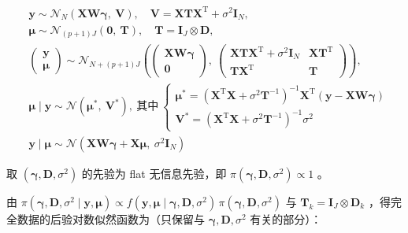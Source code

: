 \documentclass[12pt,a4paper]{ctexart}
\numberwithin{figure}{section}
\numberwithin{table}{section}
\begin{document}
\begin{equation*}
\begin{aligned}
&\boldsymbol{y}\sim\mathcal{N}_{N}\left(\mathbf{XW}\boldsymbol{\gamma},\ \mathbf{V}\right),\quad \mathbf{V}=\mathbf{XTX}^{\mathrm{T}}+\sigma^{2}\mathbf{I}_{N},\\
&\boldsymbol{\mu}\sim\mathcal{N}_{(p+1)J}\left(\mathbf{0},\ \mathbf{T}\right),\quad \mathbf{T}=\mathbf{I}_{J}\otimes\mathbf{D},\\
&\begin{pmatrix}\boldsymbol{y}\\[2pt]\boldsymbol{\mu}\end{pmatrix}\sim\mathcal{N}_{N+(p+1)J}\left(\begin{pmatrix}\mathbf{XW}\boldsymbol{\gamma}\\[2pt]\mathbf{0}\end{pmatrix},\ \begin{pmatrix}\mathbf{XTX}^{\mathrm{T}}+\sigma^{2}\mathbf{I}_{N} & \mathbf{XT}^{\mathrm{T}}\\[2pt]\mathbf{TX}^{\mathrm{T}} & \mathbf{T}\end{pmatrix}\right),\\
&\boldsymbol{\mu}\mid\boldsymbol{y}\sim\mathcal{N}\left(\boldsymbol{\mu}^{*},\ \mathbf{V}^{*}\right),\ \text{其中}\
\begin{cases}
\boldsymbol{\mu}^{*}=\left(\mathbf{X}^{\mathrm{T}}\mathbf{X}+\sigma^{2}\mathbf{T}^{-1}\right)^{-1}\mathbf{X}^{\mathrm{T}}\left(\boldsymbol{y}-\mathbf{XW}\boldsymbol{\gamma}\right)\\[6pt]
\mathbf{V}^{*}=\left(\mathbf{X}^{\mathrm{T}}\mathbf{X}+\sigma^{2}\mathbf{T}^{-1}\right)^{-1}\sigma^{2}
\end{cases}\\
&\boldsymbol{y}\mid\boldsymbol{\mu}\sim\mathcal{N}\left(\mathbf{XW}\boldsymbol{\gamma}+\mathbf{X}\boldsymbol{\mu},\ \sigma^{2}\mathbf{I}_{N}\right)
\end{aligned}
\end{equation*}

取 $(\boldsymbol{\gamma},\mathbf{D},\sigma^{2})$ 的先验为 flat 无信息先验，即 $\pi(\boldsymbol{\gamma},\mathbf{D},\sigma^{2})\propto 1$ 。

由 $\pi(\boldsymbol{\gamma},\mathbf{D},\sigma^{2}\mid\boldsymbol{y},\boldsymbol{\mu})\propto f(\boldsymbol{y},\boldsymbol{\mu}\mid\boldsymbol{\gamma},\mathbf{D},\sigma^{2})\,\pi(\boldsymbol{\gamma},\mathbf{D},\sigma^{2})$ 与 $\mathbf{T}_{k}=\mathbf{I}_{J}\otimes\mathbf{D}_{k}$ ，得完全数据的后验对数似然函数为（只保留与 $\boldsymbol{\gamma},\mathbf{D},\sigma^{2}$ 有关的部分）：
\end{document}

